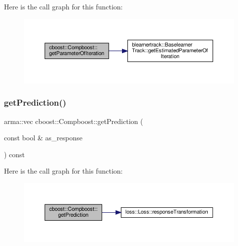 Here is the call graph for this function\+:\nopagebreak
\begin{figure}[H]
\begin{center}
\leavevmode
\includegraphics[width=350pt]{classcboost_1_1_compboost_a97b02aa81981e08658d896ff9798b5d0_cgraph}
\end{center}
\end{figure}
\mbox{\label{classcboost_1_1_compboost_a741143ae1cb41c54346e19f8bec3454d}} 
\subsubsection{\texorpdfstring{get\+Prediction()}{getPrediction()}}
{\footnotesize\ttfamily arma\+::vec cboost\+::\+Compboost\+::get\+Prediction (\begin{DoxyParamCaption}\item[{const bool \&}]{as\+\_\+response }\end{DoxyParamCaption}) const}

Here is the call graph for this function\+:\nopagebreak
\begin{figure}[H]
\begin{center}
\leavevmode
\includegraphics[width=350pt]{classcboost_1_1_compboost_a741143ae1cb41c54346e19f8bec3454d_cgraph}
\end{center}
\end{figure}
\mbox{\label{classcboost_1_1_compboost_a028c381577a136f8601aaf8433cf606c}} 
